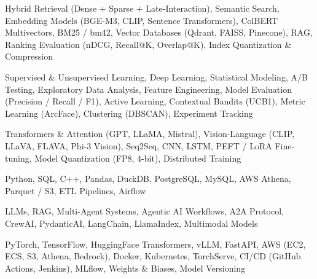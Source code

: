 \documentclass[letter,10pt]{article}
\begin{document}
 Hybrid Retrieval (Dense + Sparse + Late-Interaction), Semantic Search, Embedding Models (BGE-M3, CLIP, Sentence Transformers), ColBERT Multivectors, BM25 / bm42, Vector Databases (Qdrant, FAISS, Pinecone), RAG, Ranking Evaluation (nDCG, Recall@K, Overlap@K), Index Quantization \& Compression\par\vspace{2pt}

 Supervised \& Unsupervised Learning, Deep Learning, Statistical Modeling, A/B Testing, Exploratory Data Analysis, Feature Engineering, Model Evaluation (Precision / Recall / F1), Active Learning, Contextual Bandits (UCB1), Metric Learning (ArcFace), Clustering (DBSCAN), Experiment Tracking\par\vspace{2pt}

 Transformers \& Attention (GPT, LLaMA, Mistral), Vision-Language (CLIP, LLaVA, FLAVA, Phi-3 Vision), Seq2Seq, CNN, LSTM, PEFT / LoRA Fine-tuning, Model Quantization (FP8, 4-bit), Distributed Training\par\vspace{2pt}

 Python, SQL, C++, Pandas, DuckDB, PostgreSQL, MySQL, AWS Athena, Parquet / S3, ETL Pipelines, Airflow\par\vspace{2pt}

 LLMs, RAG, Multi-Agent Systems, Agentic AI Workflows, A2A Protocol, CrewAI, PydanticAI, LangChain, LlamaIndex, Multimodal Models\par\vspace{2pt}

 PyTorch, TensorFlow, HuggingFace Transformers, vLLM, FastAPI, AWS (EC2, ECS, S3, Athena, Bedrock), Docker, Kubernetes, TorchServe, CI/CD (GitHub Actions, Jenkins), MLflow, Weights \& Biases, Model Versioning
\end{document}
